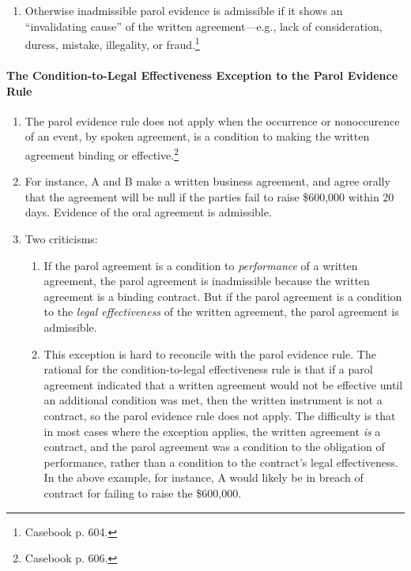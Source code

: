 \begin{enumerate}
    \item Otherwise inadmissible parol evidence is admissible if it shows an 
    ``invalidating cause'' of the written agreement---e.g., lack of 
    consideration, duress, mistake, illegality, or fraud.\footnote{Casebook p. 
    604.}
\end{enumerate}

\paragraph{The Condition-to-Legal Effectiveness Exception to the Parol 
Evidence Rule}

\begin{enumerate}
    \item The parol evidence rule does not apply when the occurrence or 
    nonoccurence of an event, by spoken agreement, is a condition to making 
    the written agreement binding or effective.\footnote{Casebook p. 606.}
    \item For instance, A and B make a written business agreement, and agree 
    orally that the agreement will be null if the parties fail to raise 
    \$600,000 within 20 days. Evidence of the oral agreement is admissible.
    \item Two criticisms:
    \begin{enumerate}
        \item If the parol agreement is a condition to \emph{performance} of a 
        written agreement, the parol agreement is inadmissible because the 
        written agreement is a binding contract. But if the parol agreement is 
        a condition to the \emph{legal effectiveness} of the written 
        agreement, the parol agreement is admissible.
        \item This exception is hard to reconcile with the parol evidence 
        rule. The rational for the condition-to-legal effectiveness rule is 
        that if a parol agreement indicated that a written agreement would not 
        be effective until an additional condition was met, then the written 
        instrument is not a contract, so the parol evidence rule does not 
        apply. The difficulty is that in most cases where the exception 
        applies, the written agreement \emph{is} a contract, and the parol 
        agreement was a condition to the obligation of performance, rather 
        than a condition to the contract's legal effectiveness. In the above 
        example, for instance, A would likely be in breach of contract for 
        failing to raise the \$600,000.
    \end{enumerate}
\end{enumerate}

